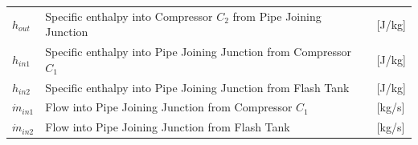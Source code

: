 \begin{center}
	\begin{tabular}{l p{10cm} l}
		$h_{out}$ 			& Specific enthalpy into Compressor $ C_2 $ from Pipe Joining Junction 			& [\si{J}/\si{kg}]\\
		$h_{in1}$ 			& Specific enthalpy into Pipe Joining Junction from Compressor $ C_1 $  					& [\si{J}/\si{kg}]\\
		$h_{in2}$ 			& Specific enthalpy into Pipe Joining Junction from Flash Tank   				& [\si{J}/\si{kg}]\\
		$\dot{m}_{in1}$ 	& Flow into Pipe Joining Junction from Compressor $ C_1 $ 		& [\si{kg}/\si{s}]\\
		$\dot{m}_{in2}$ 	& Flow into Pipe Joining Junction from Flash Tank 				& [\si{kg}/\si{s}]\\
	\end{tabular}
\end{center}



